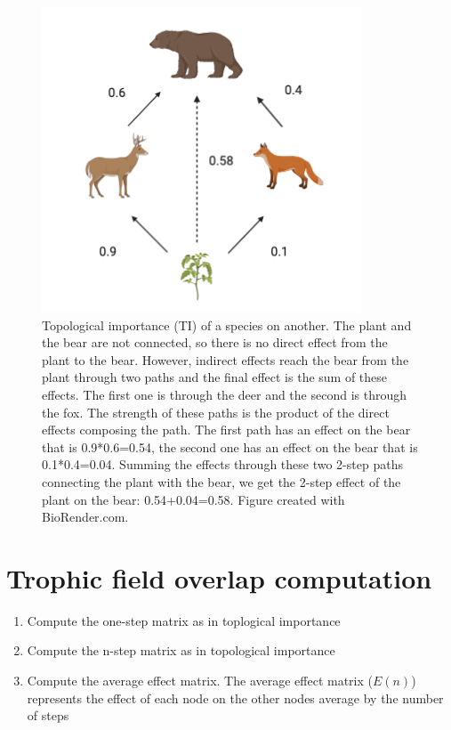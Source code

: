 \documentclass[twocolumn]{article}
\begin{document}
\begin{appendices}
\begin{enumerate}
								\begin{figure}[htbp]%
									\centering
									\includegraphics[width=1.0\linewidth]{TI_example.png}
									\caption{Topological importance (TI) of a species on another. The plant and the bear are not connected, so there is no direct effect from the plant to the bear. However, indirect effects reach the bear from the plant through two paths and the final effect is the sum of these effects. The first one is through the deer and the second is through the fox. The strength of these paths is the product of the direct effects composing the path. The first path has an effect on the bear that is 0.9*0.6=0.54, the second one has an effect on the bear that is 0.1*0.4=0.04. Summing the effects through these two 2-step paths connecting the plant with the bear, we get the 2-step effect of the plant on the bear: 0.54+0.04=0.58. Figure created with BioRender.com.} \label{fig:TI}
								\end{figure}

		\end{enumerate}

	\section{Trophic field overlap computation} \label{appendix:TO}

		\begin{enumerate}
			\item Compute the one-step matrix as in toplogical importance \item Compute the n-step matrix as in topological importance \item Compute the average effect matrix. The average effect matrix ($E(n)$) represents the effect of each node on the other nodes average by the number of steps


\end{enumerate}
\end{appendices}
\end{document}
